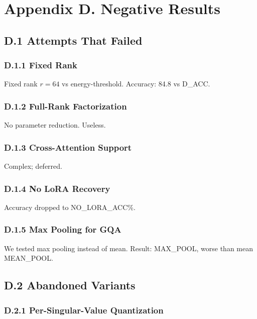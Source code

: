 
\section{Appendix D. Negative Results}

\subsection{D.1 Attempts That Failed}

\subsubsection{D.1.1 Fixed Rank}

Fixed rank $r = 64$ vs energy-threshold. Accuracy: 84.8 vs {{D\_ACC}}.

\subsubsection{D.1.2 Full-Rank Factorization}

No parameter reduction. Useless.

\subsubsection{D.1.3 Cross-Attention Support}

Complex; deferred.

\subsubsection{D.1.4 No LoRA Recovery}

Accuracy dropped to {{NO\_LORA\_ACC}}\%.

\subsubsection{D.1.5 Max Pooling for GQA}

We tested max pooling instead of mean. Result: {{MAX\_POOL}}, worse than mean 
{{MEAN\_POOL}}.

\subsection{D.2 Abandoned Variants}

\subsubsection{D.2.1 Per-Singular-Value Quantization}

